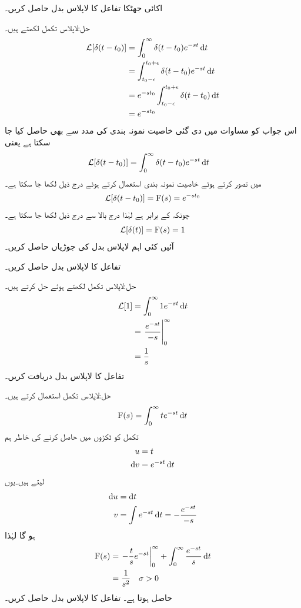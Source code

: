 اکائی جھٹکا تفاعل کا لاپلاس بدل حاصل کریں۔

حل:لاپلاس تکمل لکھتے ہیں۔
\begin{align*}
\Laplace[\delta(t-t_0)]&=\int_0^{\infty} \delta(t-t_0) e^{-st} \dif t\\
&=\int_{t_0-\epsilon}^{t_0+\epsilon} \delta(t-t_0) e^{-st} \dif t\\
&=e^{-s t_0} \int_{t_0-\epsilon}^{t_0+\epsilon} \delta(t-t_0) \dif t\\
&=e^{-st_0}
\end{align*}
اس جواب  کو مساوات  میں دی گئی خاصیت نمونہ بندی کی مدد سے بھی حاصل کیا جا سکتا ہے یعنی
  \begin{align*}
\Laplace[\delta(t-t_0)]&=\int_0^{\infty} \delta(t-t_0) e^{-st} \dif t
\end{align*}
میں  تصور کرتے ہوئے خاصیت نمونہ بندی استعمال کرتے  ہوئے درج ذیل لکھا جا سکتا ہے۔
\begin{align}
\mathcal{L}[\delta(t-t_0)]={{\textup{F}}}(s)=e^{-st_0}
\end{align}
چونکہ  کے برابر ہے لہٰذا درج بالا سے درج ذیل لکھا جا سکتا ہے۔
\begin{align}
\mathcal{L}[\delta(t)]={{\textup{F}}}(s)=1
\end{align}
آئیں کئی اہم لاپلاس بدل کی جوڑیاں حاصل کریں۔

تفاعل  کا لاپلاس بدل حاصل کریں۔

حل:لاپلاس تکمل لکھتے ہوئے حل کرتے ہیں۔
\begin{align*}
\Laplace[1]&=\int_0^{\infty} 1 e^{-st} \dif t\\
&=\left. \frac{e^{-st}}{-s} \right|_0^{\infty}\\
&=\frac{1}{s}
\end{align*}
تفاعل  کا لاپلاس بدل دریافت کریں۔

حل:لاپلاس تکمل استعمال کرتے ہیں۔
\begin{align*}
\bF(s)=\int_0^{\infty} t e^{-st} \dif t
\end{align*}
تکمل کو ٹکڑوں میں حاصل کرنے کی خاطر ہم 
\begin{align*}
u&=t\\
\dif v&=e^{-st} \dif t
\end{align*}
 لیتے ہیں۔یوں
\begin{align*}
\dif u &= \dif t\\
v&=\int e^{-st} \dif t=-\frac{e^{-st}}{-s}
\end{align*}
ہو گا لہٰذا
\begin{gather}
\begin{aligned}
\bF(s)&=\left. -\frac{t}{s}e^{-st}\right|_0^{\infty}+\int_0^{\infty} \frac{e^{-st}}{s} \dif t\\
&=\frac{1}{s^2} \quad \sigma>0
\end{aligned}
\end{gather}
حاصل ہوتا ہے۔
تفاعل  کا لاپلاس بدل حاصل کریں۔

